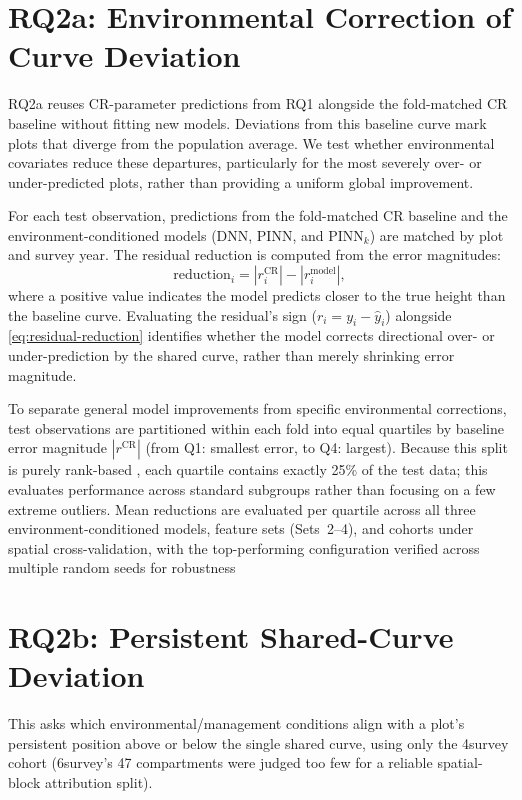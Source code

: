 \section{RQ2a: Environmental Correction of Curve Deviation}
RQ2a reuses CR-parameter predictions from RQ1 alongside the fold-matched CR baseline without fitting new models. Deviations from this baseline curve mark plots that diverge from the population average. We test whether environmental covariates reduce these departures, particularly for the most severely over- or under-predicted plots, rather than providing a uniform global improvement.

For each test observation, predictions from the fold-matched CR baseline and the environment-conditioned models (DNN, PINN, and PINN$_k$) are matched by plot and survey year. The residual reduction is computed from the error magnitudes:
\begin{equation}
\text{reduction}_i = \left|r_i^{\text{CR}}\right| - \left|r_i^{\text{model}}\right|,
\label{eq:residual-reduction}
\end{equation}
where a positive value indicates the model predicts closer to the true height than the baseline curve. Evaluating the residual's sign ($r_i = y_i - \hat{y}_i$) alongside \eqref{eq:residual-reduction} identifies whether the model corrects directional over- or under-prediction by the shared curve, rather than merely shrinking error magnitude.

To separate general model improvements from specific environmental corrections, test observations are partitioned within each fold into equal quartiles by baseline error magnitude $|r^{\text{CR}}|$ (from Q1: smallest error, to Q4: largest). Because this split is purely rank-based %
, each quartile contains exactly 25\% of the test data; this evaluates performance across standard subgroups rather than focusing on a few extreme outliers. Mean reductions are evaluated per quartile across all three environment-conditioned models, feature sets (Sets~2--4), and cohorts under spatial cross-validation, with the top-performing configuration verified across multiple random seeds for robustness %

\section{RQ2b: Persistent Shared-Curve Deviation}
\label{sec:rq2b}
This asks which environmental/management conditions align with a plot's persistent position above or below the single shared curve, using only the 4survey cohort (6survey's 47 compartments were judged too few for a reliable spatial-block attribution split).

